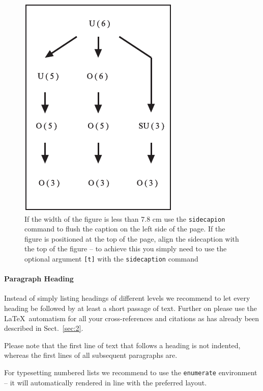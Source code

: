 \documentclass[graybox]{svmult}
\begin{document}
%
\begin{figure}[b]
\sidecaption
\includegraphics[scale=.65]{figure}
%
%
\caption{If the width of the figure is less than 7.8 cm use the \texttt{sidecapion} command to flush the caption on the left side of the page. If the figure is positioned at the top of the page, align the sidecaption with the top of the figure -- to achieve this you simply need to use the optional argument \texttt{[t]} with the \texttt{sidecaption} command}
\label{fig:1}       %
\end{figure}


\paragraph{Paragraph Heading} %
Instead of simply listing headings of different levels we recommend to let every heading be followed by at least a short passage of text.  Further on please use the \LaTeX\ automatism for all your cross-references and citations as has already been described in Sect.~\ref{sec:2}.

Please note that the first line of text that follows a heading is not indented, whereas the first lines of all subsequent paragraphs are.

For typesetting numbered lists we recommend to use the \verb|enumerate| environment -- it will automatically rendered in line with the preferred layout.
\end{document}
